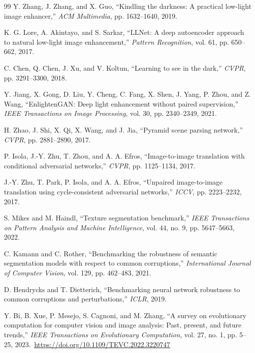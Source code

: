 \documentclass[11pt,a4paper]{article}
\begin{document}
\begin{thebibliography}{99}
Y. Zhang, J. Zhang, and X. Guo, ``Kindling the darkness: A practical low-light image enhancer,'' \emph{ACM Multimedia}, pp. 1632--1640, 2019.

K. G. Lore, A. Akintayo, and S. Sarkar, ``LLNet: A deep autoencoder approach to natural low-light image enhancement,'' \emph{Pattern Recognition}, vol. 61, pp. 650--662, 2017.

C. Chen, Q. Chen, J. Xu, and V. Koltun, ``Learning to see in the dark,'' \emph{CVPR}, pp. 3291--3300, 2018.

Y. Jiang, X. Gong, D. Liu, Y. Cheng, C. Fang, X. Shen, J. Yang, P. Zhou, and Z. Wang, ``EnlightenGAN: Deep light enhancement without paired supervision,'' \emph{IEEE Transactions on Image Processing}, vol. 30, pp. 2340--2349, 2021.

H. Zhao, J. Shi, X. Qi, X. Wang, and J. Jia, ``Pyramid scene parsing network,'' \emph{CVPR}, pp. 2881--2890, 2017.

P. Isola, J.-Y. Zhu, T. Zhou, and A. A. Efros, ``Image-to-image translation with conditional adversarial networks,'' \emph{CVPR}, pp. 1125--1134, 2017.

J.-Y. Zhu, T. Park, P. Isola, and A. A. Efros, ``Unpaired image-to-image translation using cycle-consistent adversarial networks,'' \emph{ICCV}, pp. 2223--2232, 2017.

S. Mikes and M. Haindl, ``Texture segmentation benchmark,'' \emph{IEEE Transactions on Pattern Analysis and Machine Intelligence}, vol. 44, no. 9, pp. 5647--5663, 2022.

C. Kamann and C. Rother, ``Benchmarking the robustness of semantic segmentation models with respect to common corruptions,'' \emph{International Journal of Computer Vision}, vol. 129, pp. 462--483, 2021.

D. Hendrycks and T. Dietterich, ``Benchmarking neural network robustness to common corruptions and perturbations,'' \emph{ICLR}, 2019.

Y. Bi, B. Xue, P. Mesejo, S. Cagnoni, and M. Zhang, ``A survey on evolutionary computation for computer vision and image analysis: Past, present, and future trends,'' \emph{IEEE Transactions on Evolutionary Computation}, vol. 27, no. 1, pp. 5--25, 2023.\
\url{https://doi.org/10.1109/TEVC.2022.3220747}


\end{thebibliography}
\end{document}
